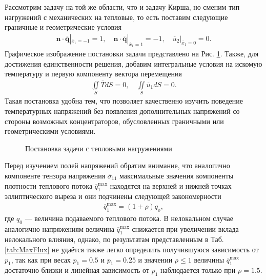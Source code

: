 Рассмотрим задачу на той же области, что и задачу Кирша, но сменим тип нагружений с механических на тепловые, то есть поставим следующие граничные и геометрические условия
\begin{gather*}
	\boldsymbol{n} \cdot \overline{\boldsymbol{q}}|_{\overline{x}_1 = -1} = 1,
	\quad
	\boldsymbol{n} \cdot \overline{\boldsymbol{q}}|_{\overline{x}_1 = 1} = -1,
	\quad
	\overline{u}_2 |_{\overline{x}_1 = 0} = 0.
\end{gather*}
Графическое изображение постановки задачи представлено на Рис. \ref{fig:ThermalKirshProblem}. Также, для достижения единственности решения, добавим интегральные условия на искомую температуру и первую компоненту вектора перемещения
\begin{gather*}
	\iint\limits_S \overline{T} dS = 0,
	\quad
	\iint\limits_S \overline{u}_1 dS = 0.
\end{gather*}
Такая постановка удобна тем, что позволяет качественно изучить поведение температурных напряжений без появления дополнительных напряжений со стороны возможных концентраторов, обусловленных граничными или геометрическими условиями.

\begin{figure}[ht]
    \caption{Постановка задачи с тепловыми нагружениями}
    \label{fig:ThermalKirshProblem}
\end{figure}

Перед изучением полей напряжений обратим внимание, что аналогично компоненте тензора напряжения $\overline{\sigma}_{11}$ максимальные значения компоненты плотности теплового потока $\overline{q}_1^{\max}$ находятся на верхней и нижней точках эллиптического выреза и они подчинены следующей закономерности
\begin{gather*}
	\overline{q}_1^{\max} = (1 + \rho) q_o,
\end{gather*}
где $q_0$ --- величина подаваемого теплового потока. В нелокальном случае аналогично напряжениям величина $\overline{q}_1^{\max}$ снижается при увеличении вклада нелокального влияния, однако, по результатам представленным в Таб. \ref{tab:MaxFlux} не удаётся также легко определить получившуюся зависимость от $p_1$, так как при весах $p_1 = 0.5$ и $p_1 = 0.25$ и значении $\rho \leqslant 1$ величины $\overline{q}_1^{\max}$ достаточно близки и линейная зависимость от $p_1$ наблюдается только при $\rho = 1.5$.

